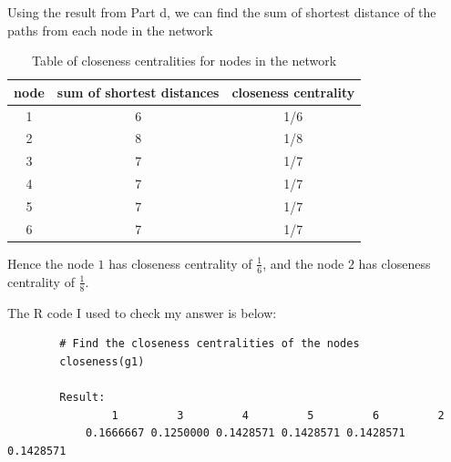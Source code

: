 \begin{answer}
    Using the result from Part d, we can find the sum of shortest distance of the paths from each node in the network
    \begin{table}[H]
    \centering
    \caption{Table of closeness centralities for nodes in the network}
    \label{tab:tab2}
    \begin{tabular}{|c|c|c|}
    \hline
    \textbf{node} & \textbf{sum of shortest distances} & \textbf{closeness centrality} \\ \hline
    1             & 6                                  & 1/6                             \\ \hline
    2             & 8                                  & 1/8                             \\ \hline
    3             & 7                                  & 1/7                             \\ \hline
    4             & 7                                  & 1/7                             \\ \hline
    5             & 7                                  & 1/7                             \\ \hline
    6             & 7                                  & 1/7                             \\ \hline
    \end{tabular}
    \end{table}
    Hence the node $1$ has closeness centrality of $\tfrac{1}{6}$, and the node $2$ has closeness centrality of $\tfrac{1}{8}$.
    
    The R code I used to check my answer is below:
    \begin{verbatim}
        # Find the closeness centralities of the nodes
        closeness(g1)
        
        Result:
                1         3         4         5         6         2 
            0.1666667 0.1250000 0.1428571 0.1428571 0.1428571 0.1428571 
    \end{verbatim}
\end{answer}